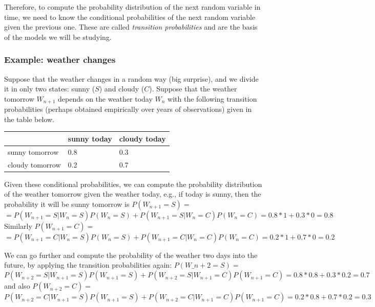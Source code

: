 \documentclass[
  letterpaper,
  DIV=11,
  numbers=noendperiod]{scrreprt}
\begin{document}
Therefore, to compute the probability distribution of the next random
variable in time, we need to know the conditional probabilities of the
next random variable given the previous one. These are called
\emph{transition probabilities} and are the basis of the models we will
be studying.

\subsubsection{Example: weather changes}\label{example-weather-changes}

Suppose that the weather changes in a random way (big surprise), and we
divide it in only two states: sunny (\(S\)) and cloudy (\(C\)). Suppose
that the weather tomorrow \(W_{n+1}\) depends on the weather today
\(W_n\) with the following transition probabilities (perhaps obtained
empirically over years of observations) given in the table below.

\begin{longtable}[]{@{}lll@{}}
\toprule\noalign{}
& sunny today & cloudy today \\
\midrule\noalign{}
\endhead
\bottomrule\noalign{}
\endlastfoot
sunny tomorrow & 0.8 & 0.3 \\
cloudy tomorrow & 0.2 & 0.7 \\
\end{longtable}

Given these conditional probabilities, we can compute the probability
distribution of the weather tomorrow given the weather today, e.g., if
today is sunny, then the probability it will be sunny tomorrow is
\(P(W_{n+1} = S ) =\)
\[ = P(W_{n+1} = S | W_n = S) P(W_n = S) + P(W_{n+1} = S | W_n = C) P(W_n = C) = 0.8 * 1  + 0.3* 0 = 0.8\]
Similarly \(P(W_{n+1} = C)=\)
\[ = P(W_{n+1} = C | W_n = S) P(W_n = S) + P(W_{n+1} = C | W_n = C) P(W_n = C) = 0.2 * 1  + 0.7* 0 = 0.2\]

We can go further and compute the probability of the weather two days
into the future, by applying the transition probabilities again:
\(P(W\_{n+2} = S ) =\)
\[P(W_{n+2} = S | W_{n+1} = S) P(W_{n+1} = S) + P(W_{n+2} = S | W_{n+1} = C) P(W_{n+1} = C) = 0.8 * 0.8  + 0.3* 0.2 = 0.7\]
and also \(P(W_{n+2} = C) =\)
\[P(W_{n+2} = C | W_{n+1} = S) P(W_{n+1} = S) + P(W_{n+2} = C | W_{n+1} = C) P(W_{n+1} = C) = 0.2 *0.8  + 0.7* 0.2 = 0.3\]
\end{document}
